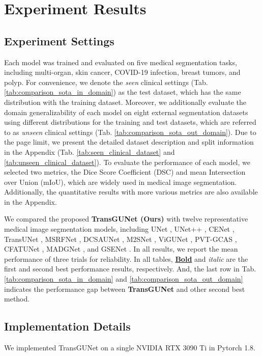 \section{Experiment Results}

\subsection{Experiment Settings}

Each model was trained and evaluated on five medical segmentation tasks, including multi-organ, skin cancer, COVID-19 infection, breast tumors, and polyp. For convenience, we denote the \textit{seen} clinical settings (Tab. \ref{tab:comparison_sota_in_domain}) as the test dataset, which has the same distribution with the training dataset. Moreover, we additionally evaluate the domain generalizability of each model on eight external segmentation datasets using different distributions for the training and test datasets, which are referred to as \textit{unseen} clinical settings (Tab. \ref{tab:comparison_sota_out_domain}). Due to the page limit, we present the detailed dataset description and split information in the Appendix (Tab. \ref{tab:seen_clinical_dataset} and \ref{tab:unseen_clinical_dataset}). To evaluate the performance of each model, we selected two metrics, the Dice Score Coefficient (DSC) and mean Intersection over Union (mIoU), which are widely used in medical image segmentation. Additionally, the quantitative results with more various metrics are also available in the Appendix.

We compared the proposed \textbf{TransGUNet (Ours)} with twelve representative medical image segmentation models, including UNet \cite{ronneberger2015u}, UNet++ \cite{zhou2018unet++}, CENet \cite{gu2019net}, TransUNet \cite{chen2021transunet}, MSRFNet \cite{srivastava2021msrf}, DCSAUNet \cite{xu2023dcsau}, M2SNet \cite{zhao2023m}, ViGUNet \cite{jiang2023vig}, PVT-GCAS \cite{rahman2024g}, CFATUNet \cite{wang2024cfatransunet}, MADGNet \cite{nam2024modality}, and GSENet \cite{li2025gse}. In all results, we report the mean performance of three trials for reliability. In all tables, \textbf{\underline{Bold}} and \textit{italic} are the first and second best performance results, respectively. And, the last row in Tab. \ref{tab:comparison_sota_in_domain} and \ref{tab:comparison_sota_out_domain} indicates the performance gap between \textbf{TransGUNet} and other second best method.

\subsection{Implementation Details}
We implemented TransGUNet on a single NVIDIA RTX 3090 Ti in Pytorch 1.8.

